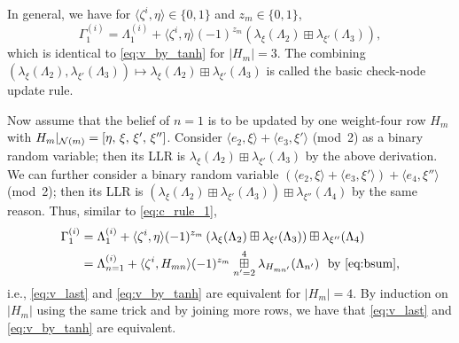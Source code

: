 \documentclass{ieeeaccess}
\newcommand{\sN}{{\cal N}}
\theoremstyle{definition}		%
\begin{document}
In general, we have for  $\langle \zeta^i, \eta \rangle \in\{0,1\}$  and   $z_m\in\{0,1\}$, 
	\begin{equation} \label{eq:c_rule_1}
	\Gamma_1^{(i)} = \Lambda_1^{(i)} + \langle \zeta^i, \eta \rangle (-1)^{z_m} ( \lambda_{\xi}(\Lambda_2) \boxplus \lambda_{\xi'}(\Lambda_3) ),
	\end{equation}
which is identical to \eqref{eq:v_by_tanh} for $|H_m|=3$. 
%
%
The combining $(\lambda_{\xi}(\Lambda_2), \lambda_{\xi'}(\Lambda_3)) \mapsto \lambda_{\xi}(\Lambda_2) \boxplus \lambda_{\xi'}(\Lambda_3)$ is called the basic check-node update rule. 



Now assume that the belief of $n=1$ is to be updated by one weight-four row $H_m$ with $H_m|_{\sN(m)}=[\eta,\, \xi,\, \xi',\, \xi'']$. %
Consider $\langle e_2,\xi \rangle + \langle e_3,\xi' \rangle$ (mod~2) as a binary random variable;
then its LLR is $\lambda_{\xi}(\Lambda_2) \boxplus \lambda_{\xi'}(\Lambda_3)$ by the above derivation. 
We can further consider a binary random variable 
$\left(\langle e_2,\xi \rangle + \langle e_3,\xi' \rangle\right) + \langle e_4,\xi'' \rangle$ (mod~2); then its LLR is 
$\left( \lambda_{\xi}(\Lambda_2) \boxplus \lambda_{\xi'}(\Lambda_3) \right) \boxplus \lambda_{\xi''}(\Lambda_4)$ by the same reason.
Thus, similar to \eqref{eq:c_rule_1}, 
\begin{align*}
\Gamma_{1}^{(i)} &= \Lambda_{1}^{(i)} + \langle \zeta^i, \eta \rangle (-1)^{z_m} \left( \lambda_{\xi}(\Lambda_2) \boxplus \lambda_{\xi'}(\Lambda_3) \right) \boxplus \lambda_{\xi''}(\Lambda_4) \\
&= \Lambda_{n=1}^{(i)} + \langle \zeta^i, H_{mn} \rangle (-1)^{z_m} \overset{4}{\underset{n'=2}{\boxplus}} \lambda_{H_{mn'}}(\Lambda_{n'}) \text{~ by \eqref{eq:bsum},}
\end{align*}
i.e., \eqref{eq:v_last} and \eqref{eq:v_by_tanh} are equivalent for $|H_m|=4$.
%
By induction on $|H_m|$ using the same trick and by joining more rows, we have that \eqref{eq:v_last} and \eqref{eq:v_by_tanh} are equivalent.





\newcommand*\refLLRBP{\ref{alg:LLR-BP} }	%
\end{document}
